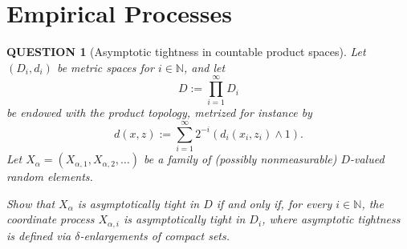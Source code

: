 \documentclass[12pt]{article}
\renewcommand{\(}{\left(}%
\renewcommand{\)}{\right)}%
\renewcommand{\[}{\left[}%
\renewcommand{\]}{\right]}%
\newtheorem{question}{QUESTION}[section]}
\begin{document}
\section{Empirical Processes}
\begin{question}[Asymptotic tightness in countable product spaces]
Let $(D_i,d_i)$ be metric spaces for $i\in\mathbb N$, and let
\begin{equation*}
D := \prod_{i=1}^\infty D_i
\end{equation*}
be endowed with the product topology, metrized for instance by
\begin{equation*}
d(x,z)
:= \sum_{i=1}^\infty 2^{-i}(d_i(x_i,z_i)\wedge 1).
\end{equation*}
Let $X_\alpha=(X_{\alpha,1},X_{\alpha,2},\dots)$ be a family of (possibly nonmeasurable)
$D$-valued random elements.

Show that $X_\alpha$ is asymptotically tight in $D$ if and only if, for every
$i\in\mathbb N$, the coordinate process $X_{\alpha,i}$ is asymptotically tight in $D_i$,
where asymptotic tightness is defined via $\delta$-enlargements of compact sets.
\end{question}
\end{document}

